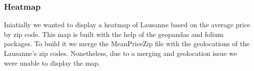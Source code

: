\documentclass[main]{subfiles}
\begin{document}
\subsubsection{Heatmap}
Iniatially we wanted to display a heatmap of Lausanne based on the average price by zip code. 
This map is built with the help of the geopandas and folium packages. 
To build it we merge the MeanPriceZip file with the geolocations of the Lausanne's zip codes. Nonetheless, 
due to a merging and geolocation issue we were unable to display the map. 
\end{document}
